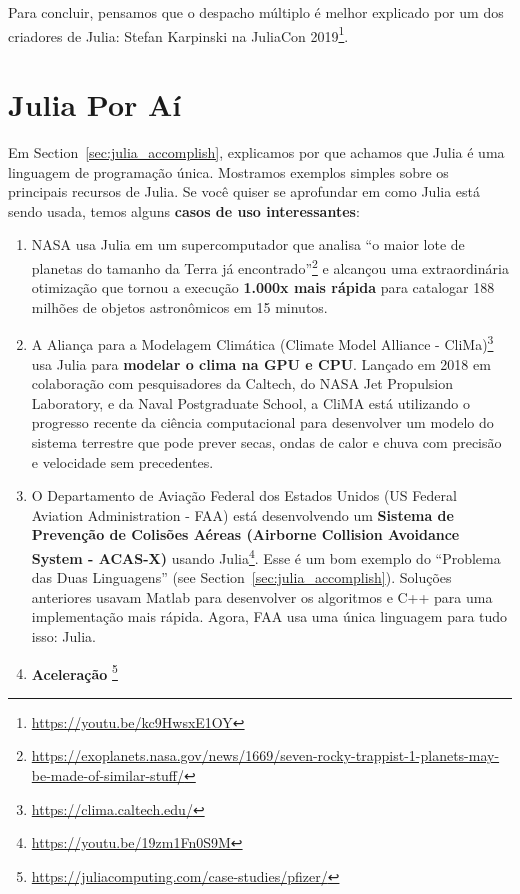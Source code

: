 \documentclass[
  notoc %
]{tufte-book}
\DeclareRobustCommand{\href}[2]{#2\footnote{\url{#1}}}
\providecommand{\tightlist}{%
  \setlength{\itemsep}{0pt}\setlength{\parskip}{0pt}
}
\begin{document}
Para concluir, pensamos que o despacho múltiplo é melhor explicado por
um dos criadores de Julia: \href{https://youtu.be/kc9HwsxE1OY}{Stefan
Karpinski na JuliaCon 2019}.

\hypertarget{sec:julia_wild}{%
\section{Julia Por Aí}\label{sec:julia_wild}}

Em Section~\ref{sec:julia_accomplish}, explicamos por que achamos que
Julia é uma linguagem de programação única. Mostramos exemplos simples
sobre os principais recursos de Julia. Se você quiser se aprofundar em
como Julia está sendo usada, temos alguns \textbf{casos de uso
interessantes}:

\begin{enumerate}
\def\labelenumi{\arabic{enumi}.}
\tightlist
\item
  NASA usa Julia em um supercomputador que analisa
  \href{https://exoplanets.nasa.gov/news/1669/seven-rocky-trappist-1-planets-may-be-made-of-similar-stuff/}{``o
  maior lote de planetas do tamanho da Terra já encontrado''} e alcançou
  uma extraordinária otimização que tornou a execução \textbf{1.000x
  mais rápida} para catalogar 188 milhões de objetos astronômicos em 15
  minutos.
\item
  \href{https://clima.caltech.edu/}{A Aliança para a Modelagem Climática
  (Climate Model Alliance - CliMa)} usa Julia para \textbf{modelar o
  clima na GPU e CPU}. Lançado em 2018 em colaboração com pesquisadores
  da Caltech, do NASA Jet Propulsion Laboratory, e da Naval Postgraduate
  School, a CliMA está utilizando o progresso recente da ciência
  computacional para desenvolver um modelo do sistema terrestre que pode
  prever secas, ondas de calor e chuva com precisão e velocidade sem
  precedentes.
\item
  \href{https://youtu.be/19zm1Fn0S9M}{O Departamento de Aviação Federal
  dos Estados Unidos (US Federal Aviation Administration - FAA) está
  desenvolvendo um \textbf{Sistema de Prevenção de Colisões Aéreas
  (Airborne Collision Avoidance System - ACAS-X)} usando Julia}. Esse é
  um bom exemplo do ``Problema das Duas Linguagens'' (see
  Section~\ref{sec:julia_accomplish}). Soluções anteriores usavam Matlab
  para desenvolver os algoritmos e C++ para uma implementação mais
  rápida. Agora, FAA usa uma única linguagem para tudo isso: Julia.
\item
  \href{https://juliacomputing.com/case-studies/pfizer/}{\textbf{Aceleração
}}
\end{enumerate}
\end{document}
